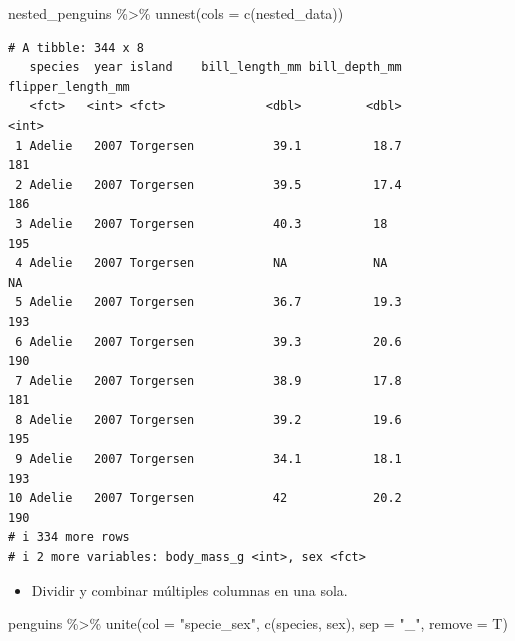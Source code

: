 \documentclass[
  letterpaper,
  DIV=11,
  numbers=noendperiod]{scrreprt}
\newenvironment{Shaded}{\begin{snugshade}}{\end{snugshade}}
\newcommand{\AttributeTok}[1]{\textcolor[rgb]{0.40,0.45,0.13}{#1}}
\newcommand{\FunctionTok}[1]{\textcolor[rgb]{0.28,0.35,0.67}{#1}}
\newcommand{\NormalTok}[1]{\textcolor[rgb]{0.00,0.23,0.31}{#1}}
\newcommand{\SpecialCharTok}[1]{\textcolor[rgb]{0.37,0.37,0.37}{#1}}
\newcommand{\StringTok}[1]{\textcolor[rgb]{0.13,0.47,0.30}{#1}}
\providecommand{\tightlist}{%
  \setlength{\itemsep}{0pt}\setlength{\parskip}{0pt}}\usepackage{longtable,booktabs,array}
\begin{document}
\begin{Shaded}
\begin{Highlighting}[]
\NormalTok{nested\_penguins }\SpecialCharTok{\%\textgreater{}\%} \FunctionTok{unnest}\NormalTok{(}\AttributeTok{cols =} \FunctionTok{c}\NormalTok{(nested\_data)) }
\end{Highlighting}
\end{Shaded}

\begin{verbatim}
# A tibble: 344 x 8
   species  year island    bill_length_mm bill_depth_mm flipper_length_mm
   <fct>   <int> <fct>              <dbl>         <dbl>             <int>
 1 Adelie   2007 Torgersen           39.1          18.7               181
 2 Adelie   2007 Torgersen           39.5          17.4               186
 3 Adelie   2007 Torgersen           40.3          18                 195
 4 Adelie   2007 Torgersen           NA            NA                  NA
 5 Adelie   2007 Torgersen           36.7          19.3               193
 6 Adelie   2007 Torgersen           39.3          20.6               190
 7 Adelie   2007 Torgersen           38.9          17.8               181
 8 Adelie   2007 Torgersen           39.2          19.6               195
 9 Adelie   2007 Torgersen           34.1          18.1               193
10 Adelie   2007 Torgersen           42            20.2               190
# i 334 more rows
# i 2 more variables: body_mass_g <int>, sex <fct>
\end{verbatim}

\begin{itemize}
\tightlist
\item
  Dividir y combinar múltiples columnas en una sola.
\end{itemize}

\begin{Shaded}
\begin{Highlighting}[]
\NormalTok{penguins }\SpecialCharTok{\%\textgreater{}\%} \FunctionTok{unite}\NormalTok{(}\AttributeTok{col =} \StringTok{"specie\_sex"}\NormalTok{,}
                   \FunctionTok{c}\NormalTok{(species, sex), }\AttributeTok{sep =} \StringTok{"\_"}\NormalTok{, }\AttributeTok{remove =}\NormalTok{ T)}
\end{Highlighting}
\end{Shaded}
\end{document}
